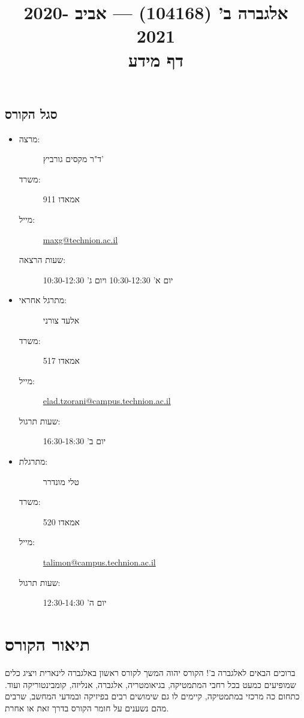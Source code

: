\documentclass[a4paper,10pt,oneside,openany]{article}
\title{
אלגברה ב' (104168) \textenglish{---} אביב 2020-2021
\\
דף מידע
}
\date{}
\begin{document}
\maketitle

\subsection*{סגל הקורס}

\begin{itemize}
\item
\begin{description}
\item[מרצה:]
ד"ר מקסים גורביץ'
\item[משרד:]
אמאדו 911
\item[מייל:]
\textenglish{\href{mailto:maxg@technion.ac.il}{maxg@technion.ac.il}}
\item[שעות הרצאה:]
יום א' 10:30-12:30 ויום ג' 10:30-12:30
\end{description}
\item
\begin{description}
\item[מתרגל אחראי:]
אלעד צורני
\item[משרד:]
אמאדו 517
\item[מייל:]
\textenglish{\href{mailto:elad.tzorani@campus.technion.ac.il}{elad.tzorani@campus.technion.ac.il}}
\item[שעות תרגול:]
יום ב' 16:30-18:30
\end{description}
\item
\begin{description}
\item[מתרגלת:]
טלי מונדרר
\item[משרד:]
אמאדו 520
\item[מייל:]
\textenglish{\href{mailto:talimon@campus.technion.ac.il}{talimon@campus.technion.ac.il}}
\item[שעות תרגול:]
יום ה' 12:30-14:30
\end{description}
\end{itemize}

\section*{תיאור הקורס}

ברוכים הבאים לאלגברה ב'! הקורס יהוה המשך לקורס ראשון באלגברה לינארית ויציג כלים שמופיעים כמעט בכל רחבי המתמטיקה, בגיאומטריה, אלגברה, אנליזה, קומבינטוריקה ועוד. כתחום כה מרכזי במתמטיקה, קיימים לו גם שימושים רבים בפיזיקה ובמדעי המחשב, שרבים מהם נשענים על חומר הקורס בדרך זאת או אחרת.
\end{document}
